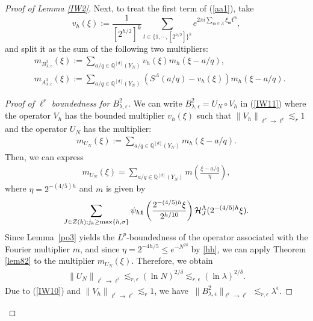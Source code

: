 \documentclass[11 pt,letterpaper]{amsart}
\theoremstyle{plain}
\theoremstyle{definition}
\theoremstyle{remark} \theoremstyle{exam} \theoremstyle{ob}
\numberwithin{equation}{section}
\begin{document}
\begin{proof}[Proof of Lemma \ref{IW2}]
	
	
	Next, to treat the first term of (\ref{aa1}), take
	$$v_{h}(\xi):=\frac{1}{[2^{h/2}]^k} \sum_{t\in \{1,\cdots,[2^{h/2}]\}^k} e^{2 \pi i \sum_{\mathfrak{m}\in\Lambda} \xi_{\mathfrak{m}} \mathfrak{t}^{\mathfrak{m}}},$$ and split it as the sum of the following two  multipliers:
	\begin{align}
		&m_{B_{\lambda, \epsilon}^{2} }(\xi):=\sum_{a/q \in \mathbb{Q}^{[d]}(Y_N)}  v_{h}(\xi)m_{h} (\xi -a/q), \label{IW11}
		\\
		&m_{A_{\lambda, \epsilon}^{3} }(\xi):=\sum_{a/q \in \mathbb{Q}^{[d]}(Y_N)}( S^{\Lambda}(a / q) -v_h(\xi))m_{h}(\xi-a/q).\label{pol2}
	\end{align}
	\begin{proof}[Proof of $\ell^r$ boundedness for $B_{\lambda, \epsilon}^{2}$]
		We can write   $B_{\lambda, \epsilon}^{2}=U_{N} \circ V_{h}$ in (\ref{IW11}) where the operator $V_h$ has the bounded multiplier $v_h(\xi)$  such that $\left\|V_{h}\right\|_{\ell^{r} \rightarrow \ell^{r}} \lesssim_{r} 1$ and
		the operator $U_{N}$ has  the multiplier:
		\begin{align*}
			m_{U_N}(\xi):=\sum_{a/q \in \mathbb{Q}^{[d]}(Y_N)}m_{h}  (\xi-a/q).
		\end{align*}
		Then, we can express
		\begin{align*}
			m_{U_N}(\xi)= \sum_{a/q \in \mathbb{Q}^{[d]}(Y_N)} m \left(\frac{\xi-a/q}{\eta}\right),
		\end{align*}
		where  $\eta=2^{-(4/5)h}$ and $m$ is given by
		\begin{align*}
			\sum_{J\in Z(k); j_k\ge \max\{h,\sigma\}} \psi_{h{\bf 1}}\left(\frac{2^{-(4/5)h}\xi}{2^{h/10}}\right)\mathcal{H}^{\Lambda}_{J}(2^{-(4/5)h}\xi ).
		\end{align*}
Since Lemma~\ref{po3} yields the $L^p$-boundedness of the operator associated with the Fourier multiplier $m$, and since $\eta=2^{-4h/5}\leq e^{-N^{2\delta}}$ by \eqref{hh},  we can apply Theorem \ref{lem82} to the multiplier $m_{U_N}(\xi)$. Therefore, we  obtain
		\begin{align}\label{IW10}
			\left\|U_{N}\right\|_{\ell^{r} \rightarrow \ell^{r}}\lesssim_{r,\epsilon} (\ln  N)^{2/\delta}\lesssim_{r,\epsilon}(\ln \lambda)^{2 / \delta} .
		\end{align}
		Due to (\ref{IW10}) and $\left\|V_{h}\right\|_{\ell^{r} \rightarrow \ell^{r}} \lesssim_{r} 1$, we have
		$ 
		\ \|B_{\lambda, \epsilon}^{2} \|_{\ell^{r} \rightarrow \ell^{r}} \lesssim_{r,\epsilon}  \lambda^{\epsilon}.
		$ 
	\end{proof}
	

\end{proof}
\end{document}
